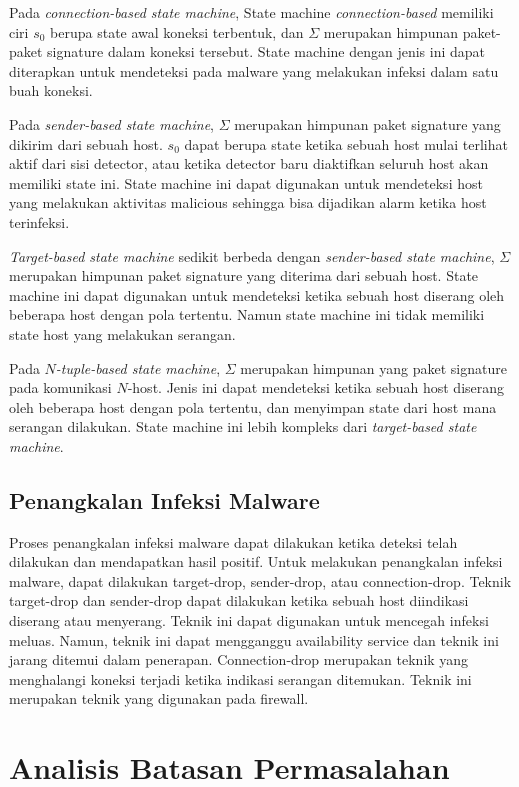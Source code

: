 Pada \textit{connection-based state machine}, State machine \textit{connection-based} memiliki ciri $s_0$ berupa state awal koneksi terbentuk, dan $\Sigma$ merupakan himpunan paket-paket signature dalam koneksi tersebut. State machine dengan jenis ini dapat diterapkan untuk mendeteksi pada malware yang melakukan infeksi dalam satu buah koneksi.

Pada \textit{sender-based state machine}, $\Sigma$ merupakan himpunan paket signature yang dikirim dari sebuah host. $s_0$ dapat berupa state ketika sebuah host mulai terlihat aktif dari sisi detector, atau ketika detector baru diaktifkan seluruh host akan memiliki state ini. State machine ini dapat digunakan untuk mendeteksi host yang melakukan aktivitas malicious sehingga bisa dijadikan alarm ketika host terinfeksi.

\textit{Target-based state machine} sedikit berbeda dengan \textit{sender-based state machine}, $\Sigma$ merupakan himpunan paket signature yang diterima dari sebuah host. State machine ini dapat digunakan untuk mendeteksi ketika sebuah host diserang oleh beberapa host dengan pola tertentu. Namun state machine ini tidak memiliki state host yang melakukan serangan.

Pada \textit{$N$-tuple-based state machine}, $\Sigma$ merupakan himpunan yang paket signature pada komunikasi $N$-host. Jenis ini dapat mendeteksi ketika sebuah host diserang oleh beberapa host dengan pola tertentu, dan menyimpan state dari host mana serangan dilakukan. State machine ini lebih kompleks dari \textit{target-based state machine}.

\subsection{Penangkalan Infeksi Malware}

Proses penangkalan infeksi malware dapat dilakukan ketika deteksi telah dilakukan dan mendapatkan hasil positif. Untuk melakukan penangkalan infeksi malware, dapat dilakukan target-drop, sender-drop, atau connection-drop. Teknik target-drop dan sender-drop dapat dilakukan ketika sebuah host diindikasi diserang atau menyerang. Teknik ini dapat digunakan untuk mencegah infeksi meluas. Namun, teknik ini dapat mengganggu availability service dan teknik ini jarang ditemui dalam penerapan. Connection-drop merupakan teknik yang menghalangi koneksi terjadi ketika indikasi serangan ditemukan. Teknik ini merupakan teknik yang digunakan pada firewall.

\section{Analisis Batasan Permasalahan}

